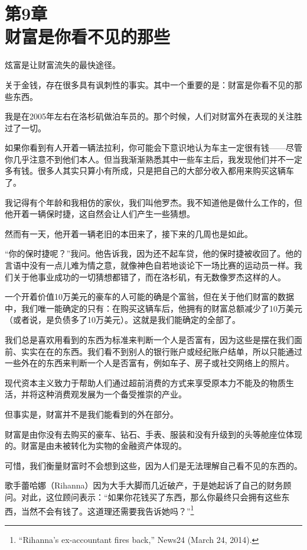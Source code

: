 
\section[第9章\q 财富是你看不见的那些]{第9章\\ 财富是你看不见的那些}

{\kaishu

炫富是让财富流失的最快途径。

}

关于金钱，存在很多具有讽刺性的事实。其中一个重要的是：财富是你看不见的那些东西。

我是在2005年左右在洛杉矶做泊车员的。那个时候，人们对财富外在表现的关注胜过了一切。

如果你看到有人开着一辆法拉利，你可能会下意识地认为车主一定很有钱——尽管你几乎注意不到他们本人。但当我渐渐熟悉其中一些车主后，我发现他们并不一定多有钱。很多人其实只算小有所成，只是把自己的大部分收入都用来购买这辆车了。

我记得有个年龄和我相仿的家伙，我们叫他罗杰。我不知道他是做什么工作的，但他开着一辆保时捷，这自然会让人们产生一些猜想。

然而有一天，他开着一辆老旧的本田来了，接下来的几周也是如此。

“你的保时捷呢？”我问。他告诉我，因为还不起车贷，他的保时捷被收回了。他的言语中没有一点儿难为情之意，就像神色自若地谈论下一场比赛的运动员一样。我们关于他事业成功的一切猜想都错了，而在洛杉矶，有无数像罗杰这样的人。

一个开着价值10万美元的豪车的人可能的确是个富翁，但在关于他们财富的数据中，我们唯一能确定的只有：在购买这辆车后，他拥有的财富总额减少了10万美元（或者说，是负债多了10万美元）。这就是我们能确定的全部了。

我们总是喜欢用看到的东西为标准来判断一个人是否富有，因为这些是摆在我们面前、实实在在的东西。我们看不到别人的银行账户或经纪账户结单，所以只能通过一些外在的东西来判断一个人是否富有，例如车子、房子或社交网络上的照片。

现代资本主义致力于帮助人们通过超前消费的方式来享受原本力不能及的物质生活，并将这种消费观发展为一个备受推崇的产业。

但事实是，财富并不是我们能看到的外在部分。

财富是由你没有去购买的豪车、钻石、手表、服装和没有升级到的头等舱座位体现的。财富是由未被转化为实物的金融资产体现的。

可惜，我们衡量财富时不会想到这些，因为人们是无法理解自己看不见的东西的。

歌手蕾哈娜（Rihanna）因为大手大脚而几近破产，于是她起诉了自己的财务顾问。对此，这位顾问表示：“如果你花钱买了东西，那么你最终只会拥有这些东西，当然不会有钱了。这道理还需要我告诉她吗？”\footnote{“Rihanna’s ex-accountant fires back,” News24 (March 24, 2014).}


